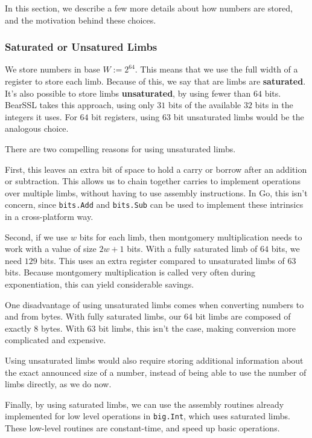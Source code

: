 \documentclass[11pt, a4paper]{article} %
\begin{document}
{In this section, we describe a few more details
about how numbers are stored, and the motivation behind
these choices.

\subsubsection{Saturated or Unsatured Limbs}

We store numbers in base
$W := 2^{64}$. This means that we use the full width of a register
to store each limb. Because of this, we say that are limbs
are \textbf{saturated}. It's also possible to store
limbs \textbf{unsaturated}, by using fewer than $64$ bits.
BearSSL 
\cite{pornin_bearssl_2020-1}
takes this approach, using only $31$ bits of the available $32$ bits
in the integers it uses. For $64$ bit registers, using $63$ bit unsaturated
limbs would be the analogous choice.

There are two compelling reasons for using unsaturated limbs.

First, this leaves an extra bit of space to hold a carry
or borrow after an addition or subtraction. This allows
us to chain together carries to implement operations over multiple
limbs, without having to use assembly instructions. In Go,
this isn't concern, since \texttt{bits.Add} and
\texttt{bits.Sub} can be used to implement these intrinsics
in a cross-platform way.

Second, if we use $w$ bits for each limb, then montgomery
multiplication needs to work with a value of size $2w + 1$ bits. With a fully
saturated limb of $64$ bits, we need $129$ bits. This uses
an extra register compared to unsaturated limbs of $63$ bits. Because
montgomery multiplication is called very often during exponentiation,
this can yield considerable savings.

One disadvantage of using unsaturated limbs comes when converting
numbers to and from bytes. With fully saturated limbs, our
$64$ bit limbs are composed of exactly $8$ bytes. With $63$ bit limbs,
this isn't the case, making conversion more
complicated and expensive.

Using unsaturated limbs would
also require storing additional information about the exact
announced size of a number, instead of being able to use
the number of limbs directly, as we do now.

Finally, by using saturated limbs, we can use the assembly routines
already implemented for low level operations
in \texttt{big.Int}, which uses saturated limbs. These low-level
routines are constant-time, and speed up basic operations.

}
\end{document}

